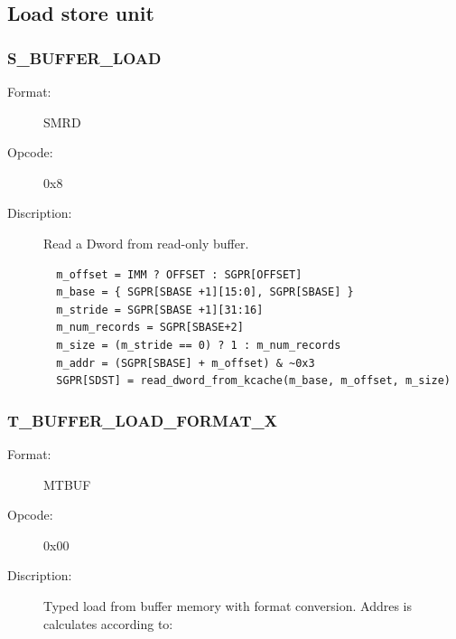 \documentclass{article}
\begin{document}
\subsection{Load store unit}
\subsubsection{S\_BUFFER\_LOAD}
\begin{description}
  \item[Format:] SMRD
  \item[Opcode:] 0x8
  \item[Discription:] Read a Dword from read-only buffer. 
  \begin{verbatim}
  m_offset = IMM ? OFFSET : SGPR[OFFSET]
  m_base = { SGPR[SBASE +1][15:0], SGPR[SBASE] }
  m_stride = SGPR[SBASE +1][31:16]
  m_num_records = SGPR[SBASE+2]
  m_size = (m_stride == 0) ? 1 : m_num_records
  m_addr = (SGPR[SBASE] + m_offset) & ~0x3
  SGPR[SDST] = read_dword_from_kcache(m_base, m_offset, m_size)
  \end{verbatim}
\end{description}
\subsubsection{T\_BUFFER\_LOAD\_FORMAT\_X}
\begin{description}
  \item[Format:] MTBUF
  \item[Opcode:] 0x00
  \item[Discription:] Typed load from buffer memory with format conversion. Addres is calculates according to:
\end{description}
\end{document}
